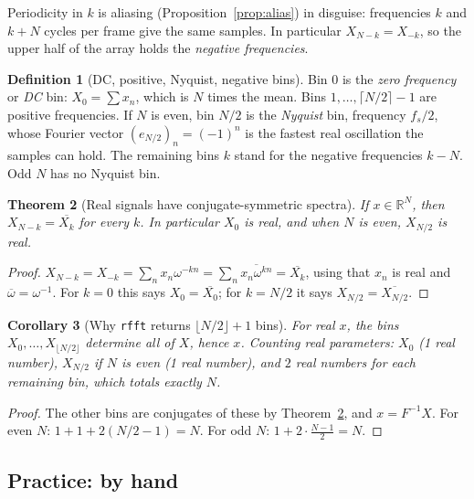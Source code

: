 \documentclass[11pt]{article}
\newtheorem{theorem}{Theorem}[section]
\newtheorem{corollary}[theorem]{Corollary}
\theoremstyle{definition}
\newtheorem{definition}[theorem]{Definition}
\newcommand{\R}{\mathbb{R}}
\newcommand{\code}[1]{\texttt{#1}}
\begin{document}
Periodicity in $k$ is aliasing (Proposition~\ref{prop:alias}) in disguise: frequencies
$k$ and $k+N$ cycles per frame give the same samples. In particular $X_{N-k}=X_{-k}$,
so the upper half of the array holds the \emph{negative frequencies}.

\begin{definition}[DC, positive, Nyquist, negative bins]
Bin 0 is the \emph{zero frequency} or \emph{DC} bin: $X_0=\sum x_n$, which is $N$ times
the mean. Bins $1,\dots,\lceil N/2\rceil-1$ are positive frequencies. If $N$ is even,
bin $N/2$ is the \emph{Nyquist} bin, frequency $f_s/2$, whose Fourier vector
$(e_{N/2})_n=(-1)^n$ is the fastest real oscillation the samples can hold. The
remaining bins $k$ stand for the negative frequencies $k-N$. Odd $N$ has no Nyquist
bin.
\end{definition}

\begin{theorem}[Real signals have conjugate-symmetric spectra]\label{thm:realsym}
If $x\in\R^N$, then $X_{N-k}=\overline{X_k}$ for every $k$. In particular $X_0$ is real,
and when $N$ is even, $X_{N/2}$ is real.
\end{theorem}
\begin{proof}
$X_{N-k}=X_{-k}=\sum_nx_n\omega^{-kn}=\sum_n\overline{x_n\omega^{kn}}=\overline{X_k}$,
using that $x_n$ is real and $\overline{\omega}=\omega^{-1}$. For $k=0$ this says
$X_0=\overline{X_0}$; for $k=N/2$ it says $X_{N/2}=\overline{X_{N/2}}$.
\end{proof}

\begin{corollary}[Why \code{rfft} returns $\lfloor N/2\rfloor+1$ bins]\label{cor:rfft}
For real $x$, the bins $X_0,\dots,X_{\lfloor N/2\rfloor}$ determine all of $X$, hence
$x$. Counting real parameters: $X_0$ (1 real number), $X_{N/2}$ if $N$ is even
(1 real number), and $2$ real numbers for each remaining bin, which totals exactly $N$.
\end{corollary}
\begin{proof}
The other bins are conjugates of these by Theorem~\ref{thm:realsym}, and $x=F^{-1}X$.
For even $N$: $1+1+2(N/2-1)=N$. For odd $N$: $1+2\cdot\frac{N-1}2=N$.
\end{proof}

\subsection{Practice: by hand}
\end{document}
